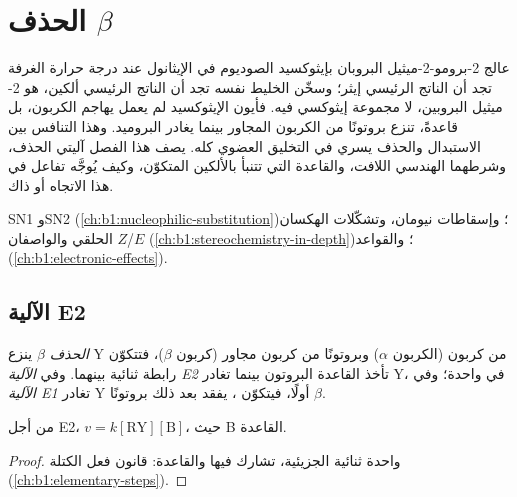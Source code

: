 \chapter{الحذف \texorpdfstring{$\beta$}{بيتا}}\label{ch:b1:elimination}

عالج 2-برومو-2-ميثيل البروبان بإيثوكسيد الصوديوم في الإيثانول عند درجة حرارة
الغرفة تجد أن الناتج الرئيسي إيثر؛ وسخّن الخليط نفسه تجد أن
الناتج الرئيسي ألكين، هو 2-ميثيل البروبين، لا مجموعة إيثوكسي
فيه. فأيون الإيثوكسيد لم يعمل  يهاجم الكربون، بل
قاعدةً، تنزع بروتونًا من الكربون المجاور بينما يغادر
البروميد. وهذا التنافس بين الاستبدال والحذف يسري في
التخليق العضوي كله. يصف هذا الفصل آليتي الحذف،
وشرطهما الهندسي اللافت، والقاعدة التي
تتنبأ بالألكين المتكوّن، وكيف يُوجَّه تفاعل في هذا الاتجاه أو
ذاك.

\begin{recall}
SN1 وSN2 (\cref{ch:b1:nucleophilic-substitution})؛ وإسقاطات نيومان،
وتشكّلات الهكسان الحلقي والواصفان $Z$/$E$
(\cref{ch:b1:stereochemistry-in-depth})؛  والقواعد
(\cref{ch:b1:electronic-effects}).
\end{recall}

\section{الآلية E2}

\begin{definition}\label{def:b1:elimination:elimination}
\emph{الحذف $\beta$} ينزع
 Y من كربون (الكربون $\alpha$) وبروتونًا من
كربون مجاور (كربون $\beta$)، فتتكوّن رابطة ثنائية بينهما.
وفي \emph{الآلية E2} تأخذ القاعدة
البروتون بينما تغادر Y، في  واحدة؛ وفي \emph{الآلية
E1} تغادر Y أولًا، فيتكوّن ،
يفقد بعد ذلك بروتونًا $\beta$.
\end{definition}

\begin{proposition}\label{prop:b1:elimination:e2-law}
من أجل E2، $v = k[\mathrm{RY}][\mathrm{B}]$، حيث B القاعدة.
\end{proposition}

\begin{proof}
 واحدة ثنائية الجزيئية، تشارك فيها  والقاعدة: قانون
فعل الكتلة  (\cref{ch:b1:elementary-steps}).
\end{proof}

